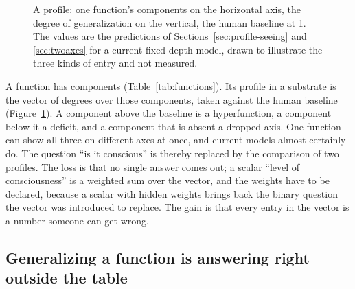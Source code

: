 \begin{figure}[t]
\centering
{}
\caption{A profile: one function's components on the horizontal axis, the degree of generalization on
the vertical, the human baseline at 1. The values are the predictions of Sections~\ref{sec:profile-seeing}
and \ref{sec:twoaxes} for a current fixed-depth model, drawn to illustrate the three kinds of entry and
not measured.}
\label{fig:profile}
\end{figure}

A function has components (Table~\ref{tab:functions}). Its profile in a substrate is the vector of
degrees over those components, taken against the human baseline (Figure~\ref{fig:profile}). A component
above the baseline is a hyperfunction, a component below it a deficit, and a component that is absent
a dropped axis. One function can show all three on different axes at once, and current models almost
certainly do. The question ``is it conscious'' is thereby replaced by the comparison of two profiles.
The loss is that no single answer comes out; a scalar ``level of consciousness'' is a weighted sum over
the vector, and the weights have to be declared, because a scalar with hidden weights brings back the
binary question the vector was introduced to replace. The gain is that every entry in the vector is a
number someone can get wrong.

\subsection{Generalizing a function is answering right outside the table}
\label{sec:memorization}

